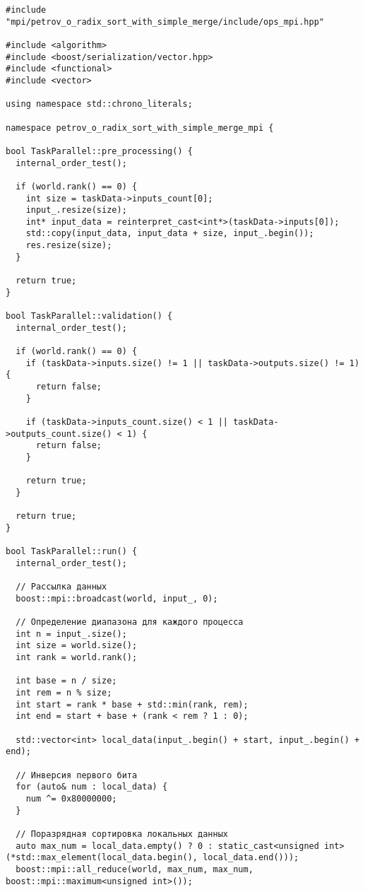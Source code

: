 \documentclass[12pt]{article}
\begin{document}
\begin{lstlisting}[caption={Файл реализации параллельной версии поразрядной сортировки}]
#include "mpi/petrov_o_radix_sort_with_simple_merge/include/ops_mpi.hpp"

#include <algorithm>
#include <boost/serialization/vector.hpp>
#include <functional>
#include <vector>

using namespace std::chrono_literals;

namespace petrov_o_radix_sort_with_simple_merge_mpi {

bool TaskParallel::pre_processing() {
  internal_order_test();

  if (world.rank() == 0) {
    int size = taskData->inputs_count[0];
    input_.resize(size);
    int* input_data = reinterpret_cast<int*>(taskData->inputs[0]);
    std::copy(input_data, input_data + size, input_.begin());
    res.resize(size);
  }

  return true;
}

bool TaskParallel::validation() {
  internal_order_test();

  if (world.rank() == 0) {
    if (taskData->inputs.size() != 1 || taskData->outputs.size() != 1) {
      return false;
    }

    if (taskData->inputs_count.size() < 1 || taskData->outputs_count.size() < 1) {
      return false;
    }

    return true;
  }

  return true;
}

bool TaskParallel::run() {
  internal_order_test();

  // Рассылка данных
  boost::mpi::broadcast(world, input_, 0);

  // Определение диапазона для каждого процесса
  int n = input_.size();
  int size = world.size();
  int rank = world.rank();

  int base = n / size;
  int rem = n % size;
  int start = rank * base + std::min(rank, rem);
  int end = start + base + (rank < rem ? 1 : 0);

  std::vector<int> local_data(input_.begin() + start, input_.begin() + end);

  // Инверсия первого бита
  for (auto& num : local_data) {
    num ^= 0x80000000;
  }

  // Поразрядная сортировка локальных данных
  auto max_num = local_data.empty() ? 0 : static_cast<unsigned int>(*std::max_element(local_data.begin(), local_data.end()));
  boost::mpi::all_reduce(world, max_num, max_num, boost::mpi::maximum<unsigned int>());


\end{lstlisting}
\end{document}
